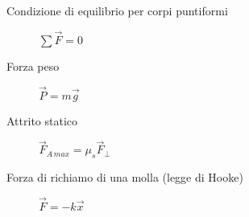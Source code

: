 \documentclass[a4paper,11pt,italian]{article}
\begin{document}
\begin{description}
  
  \item[Condizione di equilibrio per corpi puntiformi]
  $ \sum\vec{F} = 0 $
  
  \item[Forza peso] 
  $ \vec{P} = m \vec{g} $
  
  \item[Attrito statico] 
  
  $ \vec{F}_{A \, max} = \mu_s \vec{F}_\perp  $
  
  \item[Forza di richiamo di una molla (legge di Hooke)]
  $ \vec{F} = - k \vec{x} $
  
%   
\end{description}
\end{document}
